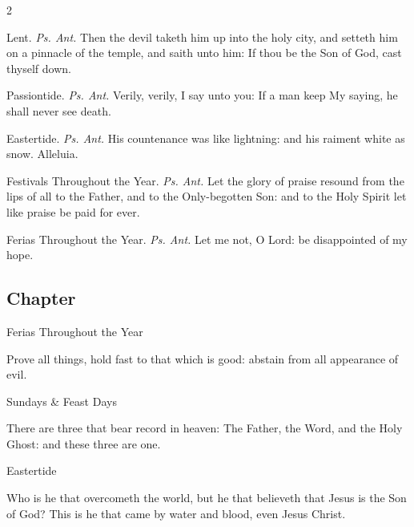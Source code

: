 \begin{multicols}{2}
\par\noindent
{\color{RubricRed}Lent.} \textit{Ps. Ant.}  Then the devil taketh him up into the holy city, and setteth him on a pinnacle of the temple, and saith unto him: If thou be the Son of God, cast thyself down.
\par\noindent
{\color{RubricRed}Passiontide.} \textit{Ps. Ant.} Verily, verily, I say unto you: If a man keep My saying, he shall never see death.
\par\noindent
{\color{RubricRed}Eastertide.} \textit{Ps. Ant.} His countenance was like lightning: and his raiment white as snow. Alleluia.
\par\noindent
{\color{RubricRed}Festivals Throughout the Year.} \textit{Ps. Ant.} Let the glory of praise resound from the lips of all to the Father, and to the Only-begotten Son: and to the Holy Spirit let like praise be paid for ever.
\par\noindent
{\color{RubricRed}Ferias Throughout the Year.} \textit{Ps. Ant.} Let me not, O Lord: be disappointed of my hope.

\vspace{-0.6\baselineskip}

\subsection{Chapter}

\vspace{-0.4\baselineskip}

\begin{inhead}
	Ferias Throughout the Year
\end{inhead}\par\noindent
Prove all things, hold fast to that which is good: abstain from all appearance of evil.

\begin{inhead}
	Sundays \& Feast Days
\end{inhead}\par\noindent
There are three that bear record in heaven: The Father, the Word, and the Holy Ghost: and these three are one.

\begin{inhead}
	Eastertide
\end{inhead}\par\noindent
Who is he that overcometh the world, but he that believeth that Jesus is the Son of God? This is he that came by water and blood, even Jesus Christ.


\end{multicols}
